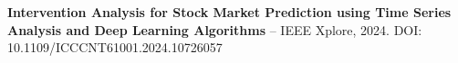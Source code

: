 \item \textbf{Intervention Analysis for Stock Market Prediction using Time Series Analysis and Deep Learning Algorithms} -- IEEE Xplore, 2024. DOI: 10.1109/ICCCNT61001.2024.10726057
